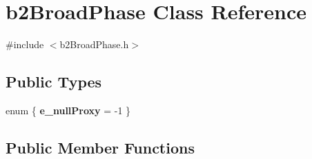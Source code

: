 \hypertarget{classb2_broad_phase}{\section{b2\-Broad\-Phase Class Reference}
\label{classb2_broad_phase}
}


{\ttfamily \#include $<$b2\-Broad\-Phase.\-h$>$}

\subsection*{Public Types}
\begin{DoxyCompactItemize}
\item 
enum \{ {\bfseries e\-\_\-null\-Proxy} =  -\/1
 \}
\end{DoxyCompactItemize}
\subsection*{Public Member Functions}
